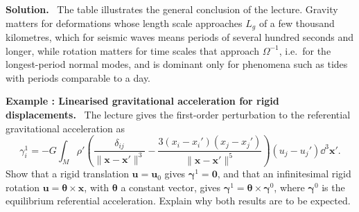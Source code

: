 \documentclass[a4paper,12pt]{paper}
\newcounter{example}
\renewenvironment{example}[1]{%
  \refstepcounter{example}%
  \begin{mdframed}[linewidth=1pt,innertopmargin=6pt,innerbottommargin=6pt]%
  \noindent\textbf{Example \theexample: #1.}\ }{%
  \end{mdframed}}
\newenvironment{solution}{\par\noindent\textbf{Solution.}\ }{\par\medskip}
\begin{document}
\begin{solution}
The table illustrates the general conclusion of the lecture. Gravity matters for deformations whose
length scale approaches $L_{g}$ of a few thousand kilometres, which for seismic waves means periods of
several hundred seconds and longer, while rotation matters for time scales that approach
$\Omega^{-1}$, i.e.\ for the longest-period normal modes, and is dominant only for phenomena such as
tides with periods comparable to a day.
\end{solution}

\begin{example}{Linearised gravitational acceleration for rigid displacements}
The lecture gives the first-order perturbation to the referential gravitational acceleration as
\begin{equation}
\gamma_{i}^{1}=-G\int_{M}\rho'\left(\frac{\delta_{ij}}{\|\mathbf{x}-\mathbf{x}'\|^{3}}-
\frac{3(x_{i}-x_{i}')(x_{j}-x_{j}')}{\|\mathbf{x}-\mathbf{x}'\|^{5}}\right)(u_{j}-u_{j}')\dd^{3}\mathbf{x}'.
\label{eq:24}
\end{equation}
Show that a rigid translation $\mathbf{u}=\mathbf{u}_{0}$ gives $\bm{\gamma}^{1}=\mathbf{0}$, and
that an infinitesimal rigid rotation $\mathbf{u}=\bm{\theta}\times\mathbf{x}$, with $\bm{\theta}$ a
constant vector, gives $\bm{\gamma}^{1}=\bm{\theta}\times\bm{\gamma}^{0}$, where $\bm{\gamma}^{0}$
is the equilibrium referential acceleration. Explain why both results are to be expected.
\end{example}
\end{document}
